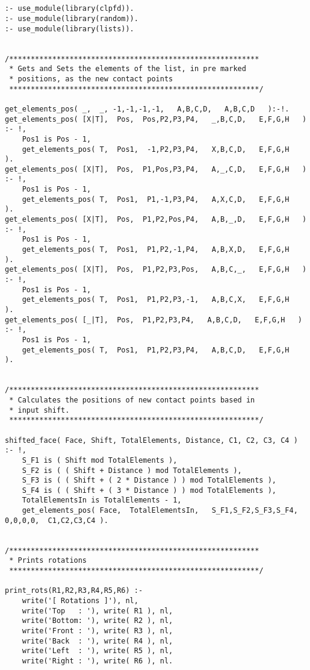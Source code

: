 \begin{lstlisting}


:- use_module(library(clpfd)).
:- use_module(library(random)).
:- use_module(library(lists)).


/**********************************************************
 * Gets and Sets the elements of the list, in pre marked
 * positions, as the new contact points
 **********************************************************/
 
get_elements_pos( _,  _, -1,-1,-1,-1,   A,B,C,D,   A,B,C,D   ):-!.
get_elements_pos( [X|T],  Pos,  Pos,P2,P3,P4,   _,B,C,D,   E,F,G,H   ) :- !,
	Pos1 is Pos - 1,
	get_elements_pos( T,  Pos1,  -1,P2,P3,P4,   X,B,C,D,   E,F,G,H   ).
get_elements_pos( [X|T],  Pos,  P1,Pos,P3,P4,   A,_,C,D,   E,F,G,H   ) :- !,
	Pos1 is Pos - 1,
	get_elements_pos( T,  Pos1,  P1,-1,P3,P4,   A,X,C,D,   E,F,G,H   ).
get_elements_pos( [X|T],  Pos,  P1,P2,Pos,P4,   A,B,_,D,   E,F,G,H   ) :- !,
	Pos1 is Pos - 1,
	get_elements_pos( T,  Pos1,  P1,P2,-1,P4,   A,B,X,D,   E,F,G,H   ).
get_elements_pos( [X|T],  Pos,  P1,P2,P3,Pos,   A,B,C,_,   E,F,G,H   ) :- !,
	Pos1 is Pos - 1,
	get_elements_pos( T,  Pos1,  P1,P2,P3,-1,   A,B,C,X,   E,F,G,H   ).
get_elements_pos( [_|T],  Pos,  P1,P2,P3,P4,   A,B,C,D,   E,F,G,H   ) :- !,
	Pos1 is Pos - 1,
	get_elements_pos( T,  Pos1,  P1,P2,P3,P4,   A,B,C,D,   E,F,G,H   ).

	
/**********************************************************
 * Calculates the positions of new contact points based in
 * input shift.
 **********************************************************/

shifted_face( Face, Shift, TotalElements, Distance, C1, C2, C3, C4 ) :- !,
	S_F1 is ( Shift mod TotalElements ),
	S_F2 is ( ( Shift + Distance ) mod TotalElements ),
	S_F3 is ( ( Shift + ( 2 * Distance ) ) mod TotalElements ),
	S_F4 is ( ( Shift + ( 3 * Distance ) ) mod TotalElements ),
	TotalElementsIn is TotalElements - 1,
	get_elements_pos( Face,  TotalElementsIn,   S_F1,S_F2,S_F3,S_F4,  0,0,0,0,  C1,C2,C3,C4 ).

	
/**********************************************************
 * Prints rotations
 **********************************************************/
	
print_rots(R1,R2,R3,R4,R5,R6) :-
	write('[ Rotations ]'), nl,
	write('Top   : '), write( R1 ), nl,
	write('Bottom: '), write( R2 ), nl,
	write('Front : '), write( R3 ), nl,
	write('Back  : '), write( R4 ), nl,
	write('Left  : '), write( R5 ), nl,
	write('Right : '), write( R6 ), nl.


\end{lstlisting}
